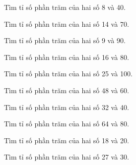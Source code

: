 \begin{ex}
  Tìm tỉ số phần trăm của hai số 8 và 40.
\end{ex}

\begin{ex}
  Tìm tỉ số phần trăm của hai số 14 và 70.
\end{ex}

\begin{ex}
  Tìm tỉ số phần trăm của hai số 9 và 90.
\end{ex}

\begin{ex}
  Tìm tỉ số phần trăm của hai số 16 và 80.
\end{ex}

\begin{ex}
  Tìm tỉ số phần trăm của hai số 25 và 100.
\end{ex}

\begin{ex}
  Tìm tỉ số phần trăm của hai số 48 và 60.
\end{ex}

\begin{ex}
  Tìm tỉ số phần trăm của hai số 32 và 40.
\end{ex}

\begin{ex}
  Tìm tỉ số phần trăm của hai số 64 và 80.
\end{ex}

\begin{ex}
  Tìm tỉ số phần trăm của hai số 18 và 20.
\end{ex}

\begin{ex}
  Tìm tỉ số phần trăm của hai số 27 và 30.
\end{ex}


